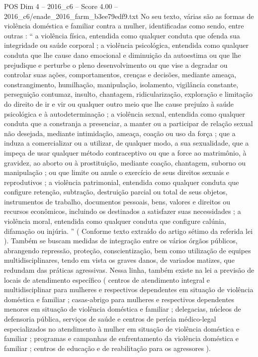 \begin{textsample}{POS Dim 4 – 2016\_c6 – Score 4.00 – 2016\_c6/enade\_2016\_farm\_b3ee79edf9.txt}
No seu texto, várias são as formas de violência doméstica e familiar contra a mulher, identificadas como sendo, entre outras : “ a violência física, entendida como qualquer conduta que ofenda sua integridade ou saúde corporal ; a violência psicológica, entendida como qualquer conduta que lhe cause dano emocional e diminuição da autoestima ou que lhe prejudique e perturbe o pleno desenvolvimento ou que vise a degradar ou controlar suas ações, comportamentos, crenças e decisões, mediante ameaça, constrangimento, humilhação, manipulação, isolamento, vigilância constante, perseguição contumaz, insulto, chantagem, ridicularização, exploração e limitação do direito de ir e vir ou qualquer outro meio que lhe cause prejuízo à saúde psicológica e à autodeterminação ; a violência sexual, entendida como qualquer conduta que a constranja a presenciar, a manter ou a participar de relação sexual não desejada, mediante intimidação, ameaça, coação ou uso da força ; que a induza a comercializar ou a utilizar, de qualquer modo, a sua sexualidade, que a impeça de usar qualquer método contraceptivo ou que a force ao matrimônio, à gravidez, ao aborto ou à prostituição, mediante coação, chantagem, suborno ou manipulação ; ou que limite ou anule o exercício de seus direitos sexuais e reprodutivos ; a violência patrimonial, entendida como qualquer conduta que configure retenção, subtração, destruição parcial ou total de seus objetos, instrumentos de trabalho, documentos pessoais, bens, valores e direitos ou recursos econômicos, incluindo os destinados a satisfazer suas necessidades ; a violência moral, entendida como qualquer conduta que configure calúnia, difamação ou injúria. ” ( Conforme texto extraído do artigo sétimo da referida lei ).
Também se buscam medidas de integração entre os vários órgãos públicos, abrangendo repressão, proteção, conscientização, bem como utilização de equipes multidisciplinares, tendo em vista os graves danos, de variados matizes, que redundam das práticas agressivas.
Nessa linha, também existe na lei a previsão de locais de atendimento específico ( centros de atendimento integral e multidisciplinar para mulheres e respectivos dependentes em situação de violência doméstica e familiar ; casas-abrigo para mulheres e respectivos dependentes menores em situação de violência doméstica e familiar ; delegacias, núcleos de defensoria pública, serviços de saúde e centros de perícia médico-legal especializados no atendimento à mulher em situação de violência doméstica e familiar ; programas e campanhas de enfrentamento da violência doméstica e familiar ; centros de educação e de reabilitação para os agressores ).

\end{textsample}
